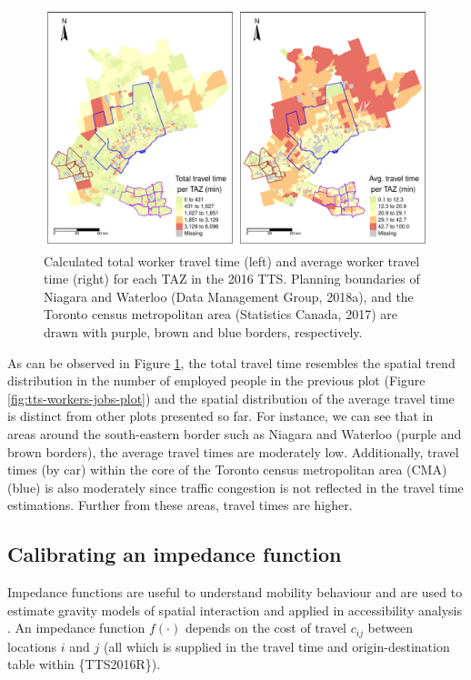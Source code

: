 \documentclass[Royal,times,sageh]{sagej}
\begin{document}
\begin{figure}
\includegraphics[width=1\linewidth]{Manuscript-Data-Package_files/figure-latex/plot-tt-ttpertrip-1} \caption{\label{fig:plot-tt-ttpertrip}Calculated total worker travel time (left) and average worker travel time (right) for each TAZ in the 2016 TTS. Planning boundaries of Niagara and Waterloo (Data Management Group, 2018a), and the Toronto census metropolitan area (Statistics Canada, 2017) are drawn with purple, brown and blue borders, respectively. }\label{fig:plot-tt-ttpertrip}
\end{figure}
\newpage

As can be observed in Figure \ref{fig:plot-tt-ttpertrip}, the total
travel time resembles the spatial trend distribution in the number of
employed people in the previous plot (Figure
\ref{fig:tts-workers-jobs-plot}) and the spatial distribution of the
average travel time is distinct from other plots presented so far. For
instance, we can see that in areas around the south-eastern border such
as Niagara and Waterloo (purple and brown borders), the average travel
times are moderately low. Additionally, travel times (by car) within the
core of the Toronto census metropolitan area (CMA) (blue) is also
moderately since traffic congestion is not reflected in the travel time
estimations. Further from these areas, travel times are higher.

\hypertarget{calibrating-an-impedance-function}{%
\subsection{Calibrating an impedance
function}\label{calibrating-an-impedance-function}}

Impedance functions are useful to understand mobility behaviour and are
used to estimate gravity models of spatial interaction
\citep{wilson1971, haynes_gravity_1985} and applied in accessibility
analysis
\citep{hansen_how_1959, talen_assessing_1998, paez_jobs_2013, barboza_balancing_2021}.
An impedance function \(f(\cdot)\) depends on the cost of travel
\(c_{ij}\) between locations \(i\) and \(j\) (all which is supplied in
the travel time and origin-destination table within \{TTS2016R\}).
\end{document}

